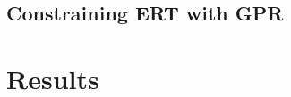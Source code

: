 \documentclass[5p]{elsarticle}
\newcommand{\COMON}{\begin{color}{blue}}
\newcommand{\COMOFF}{\end{color}}
\newcommand{\alon}{\begin{color}{red}}
\newcommand{\aloff}{\end{color}}
\begin{document}


	
                \subsection{Constraining ERT with GPR}

										

									
									
									
									
\section{Results}
										
\end{document}
